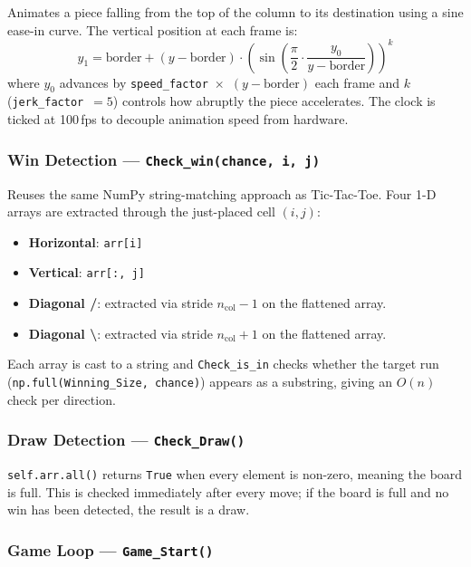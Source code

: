 \documentclass[12pt]{article}
\begin{document}
Animates a piece falling from the top of the column to its destination using a sine ease-in curve. The vertical position at each frame is:
\[
y_1 = \text{border} + (y - \text{border}) \cdot \left(\sin\!\left(\frac{\pi}{2} \cdot \frac{y_0}{y - \text{border}}\right)\right)^{k}
\]
where $y_0$ advances by \texttt{speed\_factor}~$\times$~$(y - \text{border})$ each frame and $k$ (\texttt{jerk\_factor}~$= 5$) controls how abruptly the piece accelerates. The clock is ticked at 100\,fps to decouple animation speed from hardware.
 
\subsubsection{Win Detection --- \texttt{Check\_win(chance, i, j)}}
 
Reuses the same NumPy string-matching approach as Tic-Tac-Toe. Four 1-D arrays are extracted through the just-placed cell $(i,j)$:
\begin{itemize}
    \item \textbf{Horizontal}: \texttt{arr[i]}
    \item \textbf{Vertical}: \texttt{arr[:, j]}
    \item \textbf{Diagonal /}: extracted via stride $n_{\text{col}}-1$ on the flattened array.
    \item \textbf{Diagonal \textbackslash}: extracted via stride $n_{\text{col}}+1$ on the flattened array.
\end{itemize}
Each array is cast to a string and \texttt{Check\_is\_in} checks whether the target run (\texttt{np.full(Winning\_Size, chance)}) appears as a substring, giving an $O(n)$ check per direction.
 
\subsubsection{Draw Detection --- \texttt{Check\_Draw()}}
 
\texttt{self.arr.all()} returns \texttt{True} when every element is non-zero, meaning the board is full. This is checked immediately after every move; if the board is full and no win has been detected, the result is a draw.
 
\subsubsection{Game Loop --- \texttt{Game\_Start()}}
 
\end{document}
